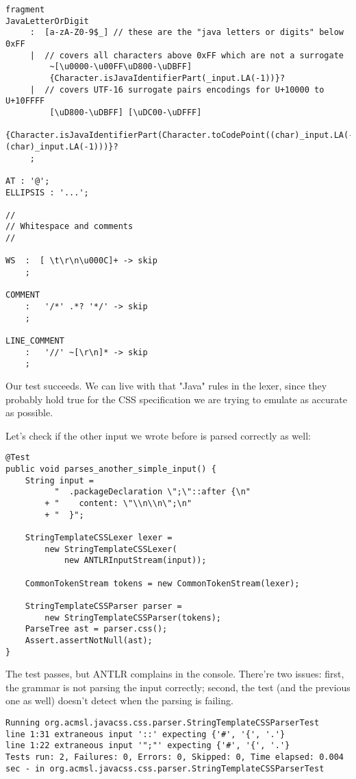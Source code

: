 \documentclass[11pt]{article}
\begin{document}
\begin{verbatim}
fragment
JavaLetterOrDigit
     :	[a-zA-Z0-9$_] // these are the "java letters or digits" below 0xFF
     |	// covers all characters above 0xFF which are not a surrogate
   	     ~[\u0000-\u00FF\uD800-\uDBFF]
   	     {Character.isJavaIdentifierPart(_input.LA(-1))}?
     |	// covers UTF-16 surrogate pairs encodings for U+10000 to U+10FFFF
   	     [\uD800-\uDBFF] [\uDC00-\uDFFF]
   	     {Character.isJavaIdentifierPart(Character.toCodePoint((char)_input.LA(-2), (char)_input.LA(-1)))}?
     ;

AT : '@';
ELLIPSIS : '...';

//
// Whitespace and comments
//

WS  :  [ \t\r\n\u000C]+ -> skip
    ;

COMMENT
    :   '/*' .*? '*/' -> skip
    ;

LINE_COMMENT
    :   '//' ~[\r\n]* -> skip
    ;
\end{verbatim}

Our test succeeds. We can live with that "Java" rules in the lexer, since they probably hold true for the CSS
specification we are trying to emulate as accurate as possible.

Let's check if the other input we wrote before is parsed correctly as well:

\begin{verbatim}
@Test
public void parses_another_simple_input() {
    String input =
          "  .packageDeclaration \";\"::after {\n"
        + "    content: \"\\n\\n\";\n"
        + "  }";

    StringTemplateCSSLexer lexer =
        new StringTemplateCSSLexer(
            new ANTLRInputStream(input));

    CommonTokenStream tokens = new CommonTokenStream(lexer);

    StringTemplateCSSParser parser =
        new StringTemplateCSSParser(tokens);
    ParseTree ast = parser.css();
    Assert.assertNotNull(ast);
}
\end{verbatim}

The test passes, but ANTLR complains in the console. There're two issues: first, the grammar is not parsing the input correctly; second, the test (and the previous one as well) doesn't
detect when the parsing is failing.

\begin{verbatim}
Running org.acmsl.javacss.css.parser.StringTemplateCSSParserTest
line 1:31 extraneous input '::' expecting {'#', '{', '.'}
line 1:22 extraneous input '";"' expecting {'#', '{', '.'}
Tests run: 2, Failures: 0, Errors: 0, Skipped: 0, Time elapsed: 0.004 sec - in org.acmsl.javacss.css.parser.StringTemplateCSSParserTest
\end{verbatim}
\end{document}
